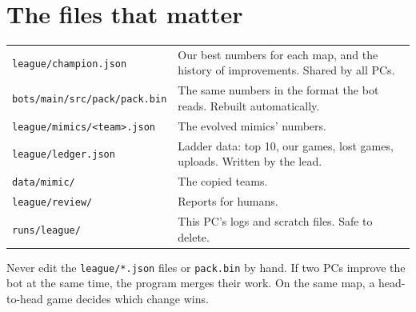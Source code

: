 \documentclass[11pt,a4paper]{article}
\newcommand{\f}[1]{\texttt{#1}}
\begin{document}
\section{The files that matter}
\begin{tabularx}{\linewidth}{@{}lX@{}}
\toprule
\f{league/champion.json} & Our best numbers for each map, and the history of improvements. Shared by all PCs.\\
\f{bots/main/src/pack/pack.bin} & The same numbers in the format the bot reads. Rebuilt automatically.\\
\f{league/mimics/<team>.json} & The evolved mimics' numbers.\\
\f{league/ledger.json} & Ladder data: top 10, our games, lost games, uploads. Written by the lead.\\
\f{data/mimic/} & The copied teams.\\
\f{league/review/} & Reports for humans.\\
\f{runs/league/} & This PC's logs and scratch files. Safe to delete.\\
\bottomrule
\end{tabularx}
Never edit the \f{league/*.json} files or \f{pack.bin} by hand. If two PCs improve the bot at the same
time, the program merges their work. On the same map, a head-to-head game decides which change wins.
\end{document}
